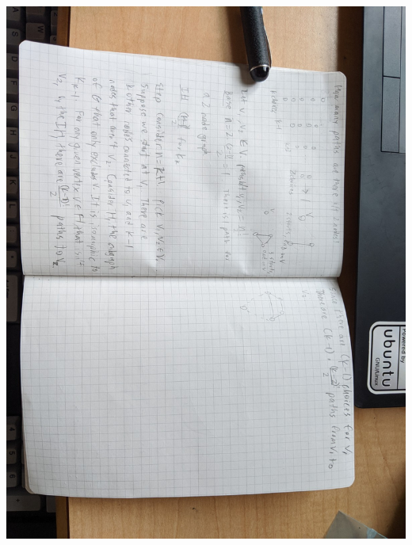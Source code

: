 \documentclass{article}
\begin{document}
\begin{landscape}
    \pagebreak
    
    \centering
    \thispagestyle{empty}
    \includegraphics[angle=90, width=0.9\linewidth]{mt/7.jpg}

\end{landscape}

\restoregeometry
    
\end{document}
